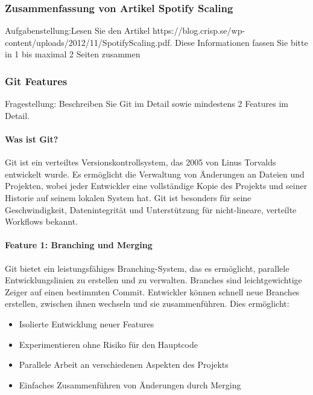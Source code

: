 

\subsubsection{Zusammenfassung von Artikel Spotify Scaling}

Aufgabenstellung:Lesen Sie den Artikel https://blog.crisp.se/wp-content/uploads/2012/11/SpotifyScaling.pdf.
Diese Informationen fassen Sie bitte in 1 bis maximal 2 Seiten zusammen


\subsubsection{Git Features}

Fragestellung: Beschreiben Sie Git im Detail sowie mindestens 2 Features im Detail.

\paragraph{Was ist Git?}
Git ist ein verteiltes Versionskontrollsystem, das 2005 von Linus Torvalds entwickelt wurde.
Es ermöglicht die Verwaltung von Änderungen an Dateien und Projekten,
wobei jeder Entwickler eine vollständige Kopie des Projekts und seiner Historie auf seinem lokalen System hat.
Git ist besonders für seine Geschwindigkeit, Datenintegrität und Unterstützung für nicht-lineare, verteilte 
Workflows bekannt. \cite{github-git}

\paragraph{Feature 1: Branching und Merging}
Git bietet ein leistungsfähiges Branching-System, das es ermöglicht, parallele Entwicklungslinien 
zu erstellen und zu verwalten. Branches sind leichtgewichtige Zeiger auf einen bestimmten Commit. 
Entwickler können schnell neue Branches erstellen, zwischen ihnen wechseln und sie zusammenführen. 
Dies ermöglicht:

    \begin{itemize}
        \item Isolierte Entwicklung neuer Features
        \item Experimentieren ohne Risiko für den Hauptcode
        \item Parallele Arbeit an verschiedenen Aspekten des Projekts
        \item Einfaches Zusammenführen von Änderungen durch Merging
    \end{itemize}

